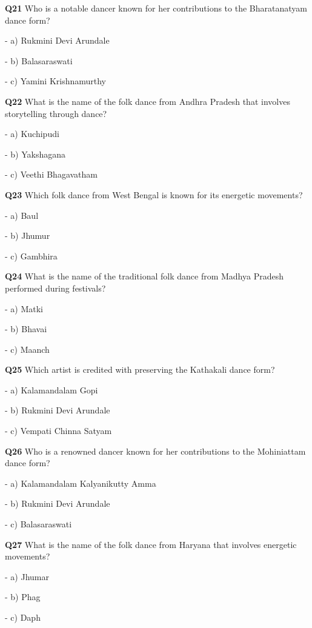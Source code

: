 \textbf{Q21} Who is a notable dancer known for her contributions to the Bharatanatyam dance form?\par
\quad - a) Rukmini Devi Arundale\par
\quad - b) Balasaraswati\par
\quad - c) Yamini Krishnamurthy\par

\textbf{Q22} What is the name of the folk dance from Andhra Pradesh that involves storytelling through dance?\par
\quad - a) Kuchipudi\par
\quad - b) Yakshagana\par
\quad - c) Veethi Bhagavatham\par

\textbf{Q23} Which folk dance from West Bengal is known for its energetic movements?\par
\quad - a) Baul\par
\quad - b) Jhumur\par
\quad - c) Gambhira\par

\textbf{Q24} What is the name of the traditional folk dance from Madhya Pradesh performed during festivals?\par
\quad - a) Matki\par
\quad - b) Bhavai\par
\quad - c) Maanch\par

\textbf{Q25} Which artist is credited with preserving the Kathakali dance form?\par
\quad - a) Kalamandalam Gopi\par
\quad - b) Rukmini Devi Arundale\par
\quad - c) Vempati Chinna Satyam\par

\textbf{Q26} Who is a renowned dancer known for her contributions to the Mohiniattam dance form?\par
\quad - a) Kalamandalam Kalyanikutty Amma\par
\quad - b) Rukmini Devi Arundale\par
\quad - c) Balasaraswati\par

\textbf{Q27} What is the name of the folk dance from Haryana that involves energetic movements?\par
\quad - a) Jhumar\par
\quad - b) Phag\par
\quad - c) Daph\par

